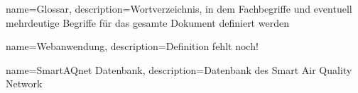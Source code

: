 {
	name=Glossar,
	description={Wortverzeichnis, in dem Fachbegriffe und eventuell mehrdeutige Begriffe für das gesamte Dokument definiert werden}
}

{
	name=Webanwendung,
	description={Definition fehlt noch!}
}

{
	name=SmartAQnet Datenbank,
	description={Datenbank des Smart Air Quality Network}
}

